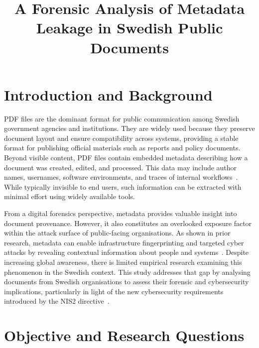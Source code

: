 \documentclass[conference]{IEEEtran}
\begin{document}
\title{A Forensic Analysis of Metadata Leakage in Swedish Public Documents}

\author{
}

\maketitle




\section{Introduction and Background}

PDF files are the dominant format for public communication among Swedish government agencies and institutions. They are widely used because they preserve document layout and ensure compatibility across systems, providing a stable format for publishing official materials such as reports and policy documents. Beyond visible content, PDF files contain embedded metadata describing how a document was created, edited, and processed. This data may include author names, usernames, software environments, and traces of internal workflows~\cite{b1}. While typically invisible to end users, such information can be extracted with minimal effort using widely available tools.

From a digital forensics perspective, metadata provides valuable insight into document provenance. However, it also constitutes an overlooked exposure factor within the attack surface of public-facing organisations. As shown in prior research, metadata can enable infrastructure fingerprinting and targeted cyber attacks by revealing contextual information about people and systems~\cite{b2}. Despite increasing global awareness, there is limited empirical research examining this phenomenon in the Swedish context. This study addresses that gap by analysing documents from Swedish organisations to assess their forensic and cybersecurity implications, particularly in light of the new cybersecurity requirements introduced by the NIS2 directive~\cite{b3}.

\section{Objective and Research Questions}
\end{document}
